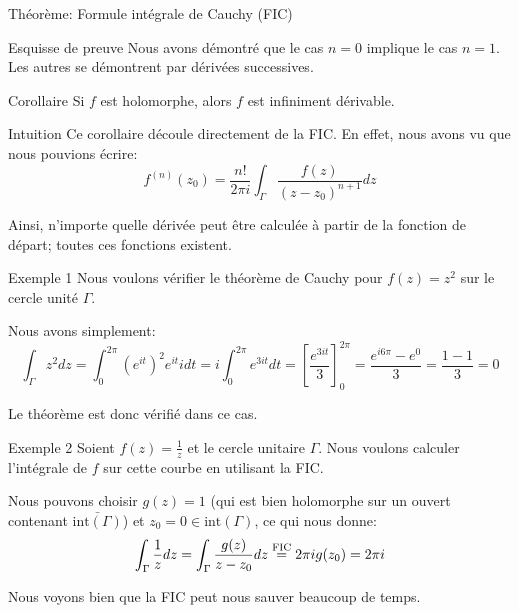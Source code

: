\documentclass[a4paper]{article}
\begin{document}
\begin{parag}{Théorème: Formule intégrale de Cauchy (FIC)}
\begin{subparag}{Esquisse de preuve}
        Nous avons démontré que le cas $n = 0$ implique le cas $n = 1$. Les autres se démontrent par dérivées successives.
    \end{subparag}
\end{parag}

\begin{parag}{Corollaire}
    Si $f$ est holomorphe, alors $f$ est infiniment dérivable.

    \begin{subparag}{Intuition}
        Ce corollaire découle directement de la FIC. En effet, nous avons vu que nous pouvions écrire: 
        \[f^{\left(n\right)}\left(z_0\right) = \frac{n!}{2\pi i} \int_{\Gamma} \frac{f\left(z\right)}{\left(z - z_0\right)^{n+1}} dz\]
        
        Ainsi, n'importe quelle dérivée peut être calculée à partir de la fonction de départ; toutes ces fonctions existent.
    \end{subparag}
    
\end{parag}


\begin{parag}{Exemple 1}
    Nous voulons vérifier le théorème de Cauchy pour $f\left(z\right) = z^2$ sur le cercle unité $\Gamma$.

    Nous avons simplement: 
    \[\int_{\Gamma} z^2 dz = \int_{0}^{2\pi} \left(e^{it}\right)^2 e^{it} i dt = i \int_{0}^{2\pi} e^{3it}dt = \left[\frac{e^{3it}}{3}\right]_{0}^{2\pi} = \frac{e^{i6\pi} - e^{0}}{3} = \frac{1 - 1}{3} = 0\]

    Le théorème est donc vérifié dans ce cas.
\end{parag}

\begin{parag}{Exemple 2}
    Soient $f\left(z\right) = \frac{1}{z}$ et le cercle unitaire $\Gamma$. Nous voulons calculer l'intégrale de $f$ sur cette courbe en utilisant la FIC.

    Nous pouvons choisir $g\left(z\right) = 1$ (qui est bien holomorphe sur un ouvert contenant $\bar{\text{int}\left(\Gamma\right)}$) et $z_0 = 0 \in \text{int}\left(\Gamma\right)$, ce qui nous donne:
    \[\int_{\Gamma} \frac{1}{z} dz = \int_{\Gamma} \frac{g\left(z\right)}{z - z_0} dz \over{=}{FIC} 2\pi i g\left(z_0\right) = 2\pi i\]

    Nous voyons bien que la FIC peut nous sauver beaucoup de temps.
\end{parag}
\end{document}
